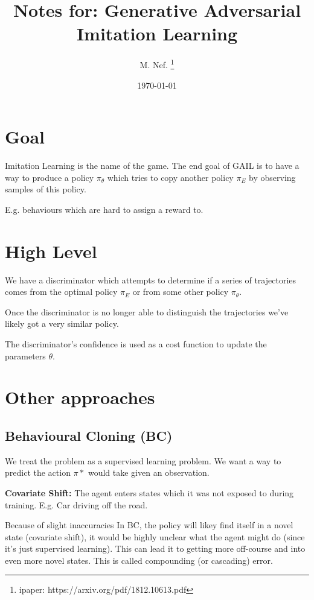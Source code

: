 \documentclass{article}
\title{Notes for: Generative Adversarial Imitation Learning}
\author{M. Nef. \thanks{ipaper: https://arxiv.org/pdf/1812.10613.pdf}}
\date{\today}
\begin{document}
\maketitle

\section{Goal}

Imitation Learning is the name of the game. The end goal of GAIL is to have a way to produce a policy \(\pi_{\theta}\) which tries to copy another policy \(\pi_{E}\) by observing samples of this policy.

E.g. behaviours which are hard to assign a reward to.

\section{High Level}

We have a discriminator which attempts to determine if a series of trajectories comes from the optimal policy \(\pi_{E}\) or from some other policy \(\pi_{\theta}\).

Once the discriminator is no longer able to distinguish the trajectories we've likely got a very similar policy.

The discriminator's confidence is used as a cost function to update the parameters \(\theta\).

\section{Other approaches}

\subsection{Behavioural Cloning (BC)}

We treat the problem as a supervised learning problem.
We want a way to predict the action \(\pi*\) would take given an observation.

\begin{center}
  \textbf{Covariate Shift:} The agent enters states which it was not exposed to during training. E.g. Car driving off the road.
\end{center}

Because of slight inaccuracies In BC, the policy will likey find itself in a novel state (covariate shift), it would be highly unclear what the agent might do (since it's just supervised learning). This can lead it to getting more off-course and into even more novel states. This is called compounding (or cascading) error.
\end{document}
